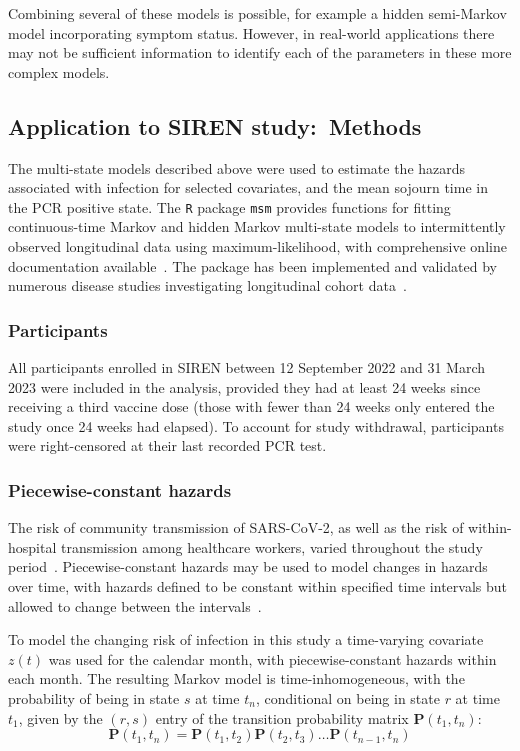 Combining several of these models is possible, for example a hidden semi-Markov model incorporating symptom status. However, in real-world applications there may not be sufficient information to identify each of the parameters in these more complex models.

\subsection{Application to SIREN study:\ Methods}

The multi-state models described above were used to estimate the hazards associated with infection for selected covariates, and the mean sojourn time in the PCR positive state. The \texttt{R} package \texttt{msm} provides functions for fitting continuous-time Markov and hidden Markov multi-state models to intermittently observed longitudinal data using maximum-likelihood, with comprehensive online documentation available~\parencite{Jackson2021-ij, Jackson2011-ry}. The package has been implemented and validated by numerous disease studies investigating longitudinal cohort data~\parencite{Tran2022-rq, Vermunt2019-wm, Webb2020-gm, Steyerberg2019-rq}.

\subsubsection{Participants}

All participants enrolled in SIREN between 12 September 2022 and 31 March 2023 were included in the analysis, provided they had at least 24 weeks since receiving a third vaccine dose (those with fewer than 24 weeks only entered the study once 24 weeks had elapsed). To account for study withdrawal, participants were right-censored at their last recorded PCR test.

\subsubsection{Piecewise-constant hazards}

The risk of community transmission of SARS-CoV-2, as well as the risk of within-hospital transmission among healthcare workers, varied throughout the study period~\parencite{UK_Government2021-ip}. Piecewise-constant hazards may be used to model changes in hazards over time, with hazards defined to be constant within specified time intervals but allowed to change between the intervals~\parencite{van-den-Hout2016-xy}.

To model the changing risk of infection in this study a time-varying covariate $z(t)$ was used for the calendar month, with piecewise-constant hazards within each month. The resulting Markov model is time-inhomogeneous, with the probability of being in state $s$ at time $t_n$, conditional on being in state $r$ at time $t_1$, given by the $(r,s)$ entry of the transition probability matrix $\mathbf{P}(t_1, t_n)$:
%
\[
    \mathbf{P}(t_1, t_n) = \mathbf{P}(t_1, t_2)\mathbf{P}(t_2, t_3) \ldots \mathbf{P}(t_{n-1}, t_n)
\]

